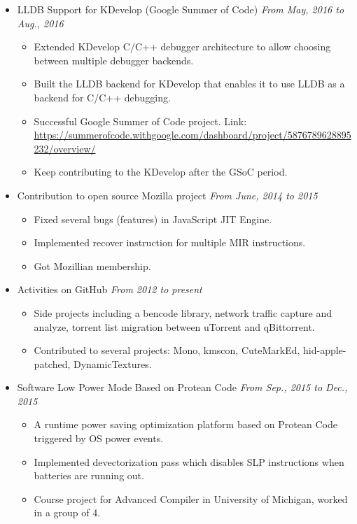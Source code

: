 \documentclass[a4paper,11pt]{article}
\begin{document}
\begin{itemize}
    \item LLDB Support for KDevelop (Google Summer of Code) \hfill \textit{From May, 2016 to Aug., 2016}
    \begin{itemize}
        \item Extended KDevelop C/C++ debugger architecture to allow choosing between multiple debugger 
backends.
        \item Built the LLDB backend for KDevelop that enables it to use LLDB as a backend for C/C++ 
debugging.
\item Successful Google Summer of Code project. Link:
\url{https://summerofcode.withgoogle.com/dashboard/project/5876789628895232/overview/}
        \item Keep contributing to the KDevelop after the GSoC period.
    \end{itemize}

    \item Contribution to open source Mozilla project \hfill \textit{From June, 2014 to 2015}
    \begin{itemize}
        \item Fixed several bugs (features) in JavaScript JIT Engine.
        \item Implemented recover instruction for multiple MIR instructions.
        \item Got Mozillian membership.
    \end{itemize}

    \item Activities on GitHub \hfill \textit{From 2012 to present}
    \begin{itemize}
        \item Side projects including a bencode library, network traffic capture and analyze, torrent list
migration between uTorrent and qBittorrent.
        \item Contributed to several projects: Mono, kmscon, CuteMarkEd, hid-apple-patched, DynamicTextures.
    \end{itemize}

    \item Software Low Power Mode Based on Protean Code \hfill \textit{From Sep., 2015 to Dec., 2015}
    \begin{itemize}
        \item A runtime power saving optimization platform based on Protean Code triggered by OS power events.
        \item Implemented devectorization pass which disables SLP instructions when batteries are running out.
        \item Course project for Advanced Compiler in University of Michigan, worked in a group of 4.
    \end{itemize}


\end{itemize}
\end{document}
